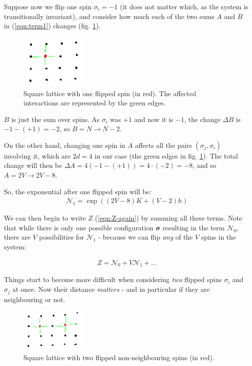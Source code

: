 \documentclass[../template.tex]{subfiles}
\begin{document}
\medskip

Suppose now we flip one spin $\sigma_i = -1$ (it does not matter which, as the system is transitionally invariant), and consider how much each of the two sums $A$ and $B$ in (\ref{eqn:term1}) changes (fig. \ref{fig:one-flip}).

\begin{figure}[H]
    \centering
    \includegraphics[width=0.3\textwidth]{image024.png}
    \caption{Square lattice with one flipped spin (in red). The affected interactions are represented by the green edges.\label{fig:one-flip}}
\end{figure}

$B$ is just the sum over spins. As $\sigma_i$ was $+1$ and now it is $-1$, the change $\Delta B$ is $-1 - (+1) = -2$, so $B = N \to N-2$.

On the other hand, changing one spin in $A$ affects all the pairs $(\sigma_j, \sigma_i)$ involving it, which are $2d=4$ in our case (the green edges in fig. \ref{fig:one-flip}). The total change will then be $\Delta A = 4 (-1 - (+1)) = 4 \cdot (-2) = -8$, and so $A = 2V \to 2V-8$.

So, the exponential after one flipped spin will be:
\begin{align}\label{eqn:term1}
    \mathcal{N}_1 = \exp\left((2V - 8)K + (V-2)h\right)
\end{align}

We can then begin to write $Z$ (\ref{eqn:Z-again}) by summing all these terms. Note that while there is only one possible configuration $\bm{\sigma}$ resulting in the term $\mathcal{N}_0$, there are $V$ possibilities for $\mathcal{N}_1$ - because we can flip \textit{any} of the $V$ spins in the system:

\begin{align*}
    Z = \mathcal{N}_0 + V \mathcal{N}_1 + \dots
\end{align*}

Things start to become more difficult when considering \textit{two} flipped spins $\sigma_i$ and $\sigma_j$ at once. Now their distance \textit{matters} - and in particular if they are neighbouring or not.

\begin{figure}[H]
    \centering
    \includegraphics[width=0.3\textwidth]{image026.png}
    \caption{Square lattice with two flipped non-neighbouring spins (in red).\label{fig:two-flip-far}}
\end{figure}
\end{document}
